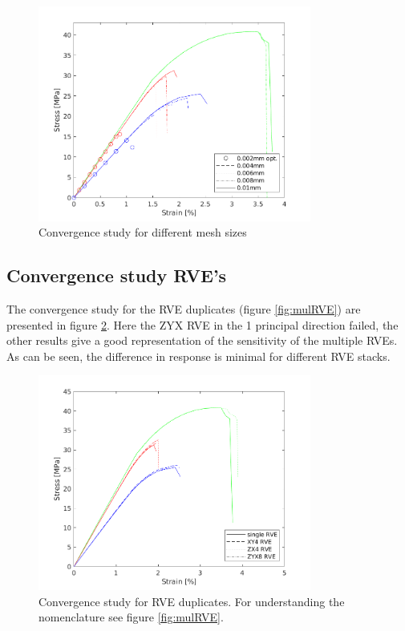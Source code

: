 \begin{figure}[htb]
    \centering
    \includegraphics[width=0.80\textwidth]{chapter_7_non-elasticmodelling/figures/meshconv.png}
    \caption{Convergence study for different mesh sizes}
    \label{fig:meshconv}
\end{figure}

\subsection{Convergence study RVE's}
The convergence study for the RVE duplicates (figure \ref{fig:mulRVE}) are presented in figure \ref{fig:RVEgraph}. Here the ZYX RVE in the 1 principal direction failed, the other results give a good representation of the sensitivity of the multiple RVEs. As can be seen, the difference in response is minimal for different RVE stacks. 

\begin{figure}[htb]
    \centering
    \includegraphics[width=0.80\textwidth]{chapter_7_non-elasticmodelling/figures/RVEconv.png}
    \caption{Convergence study for RVE duplicates. For understanding the nomenclature see figure \ref{fig:mulRVE}.}
    \label{fig:RVEgraph}
\end{figure}

